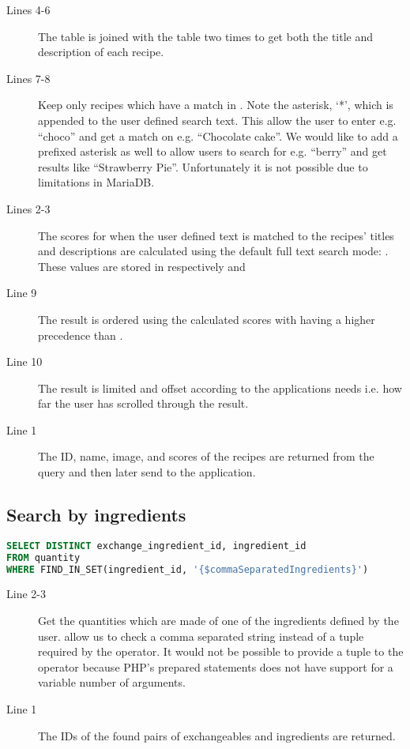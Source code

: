 \begin{description}
\item[Lines 4-6] The  table is joined with the  table two times to get both the title and description of each recipe.
\item[Lines 7-8] Keep only recipes which have a match in . Note the asterisk, `*', which is appended to the user defined search text. This allow the user to enter e.g. ``choco'' and get a match on e.g. ``Chocolate cake''. We would like to add a prefixed asterisk as well to allow users to search for e.g. ``berry'' and get results like ``Strawberry Pie''. Unfortunately it is not possible due to limitations in MariaDB.
\item[Lines 2-3] The scores for when the user defined text is matched to the recipes' titles and descriptions are calculated using the default full text search mode: . These values are stored in respectively  and 
\item[Line 9] The result is ordered using the calculated scores with  having a higher precedence than .
\item[Line 10] The result is limited and offset according to the applications needs i.e. how far the user has scrolled through the result.
\item[Line 1] The ID, name, image, and scores of the recipes are returned from the query and then later send to the application.
\end{description}



\subsection*{Search by ingredients}

\begin{lstlisting}[language=SQL, float=h, label={}, caption={\$quantityQuery, get matching quantities.}]
SELECT DISTINCT exchange_ingredient_id, ingredient_id
FROM quantity
WHERE FIND_IN_SET(ingredient_id, '{$commaSeparatedIngredients}')
\end{lstlisting}

\begin{description}
\item[Line 2-3] Get the quantities which are made of one of the ingredients defined by the user.  allow us to check a comma separated string instead of a tuple required by the  operator. It would not be possible to provide a tuple to the  operator because PHP's prepared statements does not have support for a variable number of arguments.
\item[Line 1] The IDs of the found pairs of exchangeables and ingredients are returned.
\end{description}



